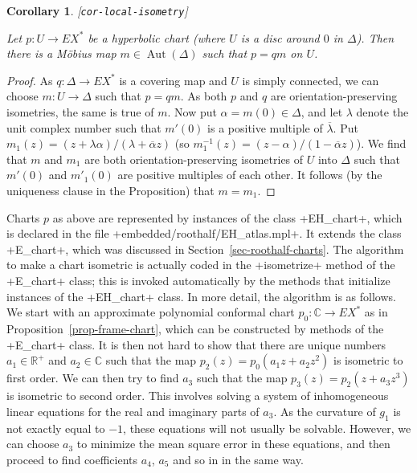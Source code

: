 \documentclass[reqno]{amsart}
\newcommand{\lbl}[1]{\label{#1}\textup{[\texttt{#1}]}\par}
\newcommand{\lbl}{\label}
\newcommand{\Aut}	{\operatorname{Aut}}
\newcommand{\Dl}        {\Delta}
\newcommand{\al}        {\alpha}
\newcommand{\lm}        {\lambda}
\newcommand{\R}         {{\mathbb{R}}}
\newcommand{\C}         {{\mathbb{C}}}
\newcommand{\ov}[1]     {\overline{#1}}
\renewcommand{\:}{\colon}
\newtheorem{corollary}[theorem]{Corollary}
\theoremstyle{definition}
\begin{document}
\begin{corollary}\lbl{cor-local-isometry}
 Let $p\:U\to EX^*$ be a hyperbolic chart (where $U$ is a disc around
 $0$ in $\Dl$).  Then there is a M\"obius map $m\in\Aut(\Dl)$ such
 that $p=qm$ on $U$.
\end{corollary}
\begin{proof}
 As $q\:\Dl\to EX^*$ is a covering map and $U$ is simply connected, we
 can choose $m\:U\to\Dl$ such that $p=qm$.  As both $p$ and $q$ are
 orientation-preserving isometries, the same is true of $m$.  Now put
 $\al=m(0)\in\Dl$, and let $\lm$ denote the unit complex number such
 that $m'(0)$ is a positive multiple of $\ov{\lm}$.  Put
 $m_1(z)=(z+\lm\al)/(\lm+\ov{\al}z)$ (so
 $m_1^{-1}(z)=(z-\al)/(1-\ov{\al}z)$).  We find that $m$ and $m_1$ are
 both orientation-preserving isometries of $U$ into $\Dl$ such that
 $m'(0)$ and $m'_1(0)$ are positive multiples of each other.  It
 follows (by the uniqueness clause in the Proposition) that $m=m_1$.
\end{proof}

Charts $p$ as above are represented by instances of the class
\mcode+EH_chart+, which is declared in the file
\fname+embedded/roothalf/EH_atlas.mpl+.  It extends the class
\mcode+E_chart+, which was discussed in
Section~\ref{sec-roothalf-charts}.  The algorithm to make a chart
isometric is actually coded in the \mcode+isometrize+ method of the
\mcode+E_chart+ class; this is invoked automatically by the methods
that initialize instances of the \mcode+EH_chart+ class.  In more
detail, the algorithm is as follows.  We start with an approximate
polynomial conformal chart $p_0\:\C\to EX^*$ as in
Proposition~\ref{prop-frame-chart}, which can be constructed by
methods of the \mcode+E_chart+ class.  It is then not hard to show
that there are unique numbers $a_1\in\R^+$ and $a_2\in\C$ such that
the map $p_2(z)=p_0(a_1z+a_2z^2)$ is isometric to first order.  We can
then try to find $a_3$ such that the map $p_3(z)=p_2(z+a_3z^3)$ is
isometric to second order.  This involves solving a system of
inhomogeneous linear equations for the real and imaginary parts of
$a_3$.  As the curvature of $g_1$ is not exactly equal to $-1$, these
equations will not usually be solvable.  However, we can choose $a_3$
to minimize the mean square error in these equations, and then proceed
to find coefficients $a_4$, $a_5$ and so in in the same way.
\end{document}
